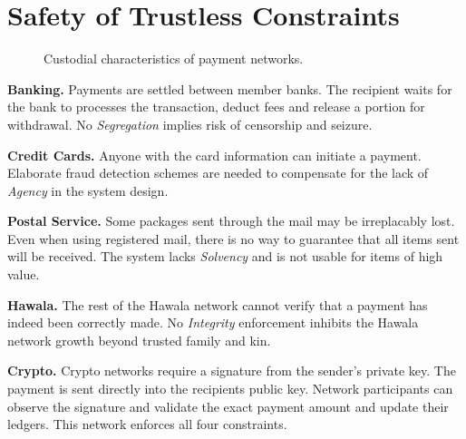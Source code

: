 \documentclass[12pt,a4paper]{article}
\begin{document}
\appendix
\newpage
\section{Safety of Trustless Constraints}\label{app:safety}
\begin{figure}[h]
\centering

\caption{Custodial characteristics of payment networks.}
\label{fig:custody}
\end{figure}

\textbf{Banking.} Payments are settled between member banks. The recipient waits for the bank to processes the transaction, deduct fees and release a portion for withdrawal. No \emph{Segregation} implies risk of censorship and seizure.

\textbf{Credit Cards.} Anyone with the card information can initiate a payment. Elaborate fraud detection schemes are needed to compensate for the lack of \emph{Agency} in the system design.

\textbf{Postal Service.} Some packages sent through the mail may be irreplacably lost. Even when using registered mail, there is no way to guarantee that all items sent will be received. The system lacks \emph{Solvency} and is not usable for items of high value.

\textbf{Hawala.} The rest of the Hawala network cannot verify that a payment has indeed been correctly made. No \emph{Integrity} enforcement inhibits the Hawala network growth beyond trusted family and kin.

\textbf{Crypto.} Crypto networks require a signature from the sender's private key. The payment is sent directly into the recipients public key. Network participants can observe the signature and validate the exact payment amount and update their ledgers. This network enforces all four constraints.
\end{document}
